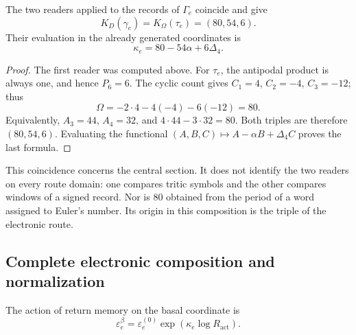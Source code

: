 \begin{theorem}
The two readers applied to the records of \(\Gamma_e\)
coincide and give
\begin{equation}
 K_D(\gamma_e)=K_\Omega(\tau_e)=(80,54,6).
 \label{x_reciprocidad:eq:el-triple}
\end{equation}
Their evaluation in the already generated coordinates is
\begin{equation}
 \kappa_e=80-54\alpha+6\Delta_4.
 \label{x_reciprocidad:eq:el-kappa}
\end{equation}
\end{theorem}
\begin{proof}
The first reader was computed above. For \(\tau_e\), the antipodal
product is always one, and hence \(P_6=6\). The cyclic count gives
\(C_1=4\), \(C_2=-4\), \(C_3=-12\); thus
\[
 \Omega=-2\cdot4-4(-4)-6(-12)=80.
\]
Equivalently, \(A_3=44\), \(A_4=32\), and
\(4\cdot44-3\cdot32=80\). Both triples are therefore
\((80,54,6)\). Evaluating the functional
\((A,B,C)\mapsto A-\alpha B+\Delta_4C\) proves the last formula.
\end{proof}

This coincidence concerns the central section. It does not identify
the two readers on every route domain: one compares tritic
symbols and the other compares windows of a signed record. Nor is
\(80\) obtained from the period of a word assigned to Euler's
number. Its origin in this composition is the triple of the electronic
route.

\subsection{Complete electronic composition and normalization}

\begin{definition}
The action of return memory on the basal coordinate is
\begin{equation}
 \varepsilon_e^\beta
 =\varepsilon_e^{(0)}\exp\!\left(\kappa_e\log R_{\mathrm{act}}\right).
 \label{x_reciprocidad:eq:el-beta}
\end{equation}
\end{definition}

